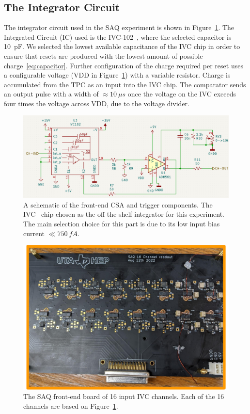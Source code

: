 \subsection{The Integrator Circuit}

The integrator circuit used in the SAQ experiment is shown in Figure~\ref{fig:saq_circuit_kicad}.
The Integrated Circuit (IC) used is the IVC-102~\citep{ivc_datasheet}, where the selected capacitor is 10~\unit{pF}.
We selected the lowest available capacitance of the IVC chip in order to ensure that resets are produced with the lowest amount of possible charge~\ref{eq:capacitor}.
Further configuration of the charge required per reset uses a configurable voltage (VDD in Figure~\ref{fig:saq_circuit_kicad}) with a variable resistor.
Charge is accumulated from the TPC as an input into the IVC chip.
The comparator sends an output pulse with a width of $\approx 10~\unit{\mu s}$ once the voltage on the IVC exceeds four times the voltage across VDD, due to the voltage divider.

\begin{figure}[]
\centering
\includegraphics[width=\textwidth]{images/saq_integrator_circuit.png}
\caption{
A schematic of the front-end CSA and trigger components.
The IVC~\citep{ivc_datasheet} chip chosen as the off-the-shelf integrator for this experiment.
The main selection choice for this part is due to its low input bias current $\ll 750~\unit{fA}$.
}
\label{fig:saq_circuit_kicad}
\end{figure}

\begin{figure}[]
\centering
\includegraphics[width=\textwidth]{images/SAQ_16_ivc_readout_board.pdf}
\caption{The SAQ front-end board of 16 input IVC channels.
Each of the 16 channels are based on Figure~\ref{fig:saq_circuit_kicad}.
}
\label{fig:saq_readout_board}
\end{figure}


